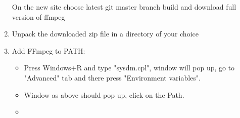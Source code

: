 \documentclass[a4paper,12pt]{book}
\begin{document}
\begin{enumerate}
\begin{minipage}[t]{\linewidth}
{		}		
		\medskip	
	\end{minipage}
	On the new site choose latest git master branch build and download full version of ffmpeg
	\item Unpack the downloaded zip file in a directory of your choice
	\item Add FFmpeg to PATH:
	\begin{itemize}
		\item Press Windows+R and type "sysdm.cpl", window will pop up, go to "Advanced" tab and there press "Environment variables".
		\item \begin{minipage}[t]{\linewidth}
			\raggedright
			\medskip	
		\end{minipage}
		Window as above should pop up, click on the Path.
		\item \begin{minipage}[t]{\linewidth}
			\raggedright
\end{minipage}
\end{itemize}
\end{enumerate}
\end{document}
